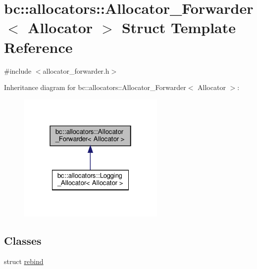 \hypertarget{structbc_1_1allocators_1_1Allocator__Forwarder}{}\section{bc\+:\+:allocators\+:\+:Allocator\+\_\+\+Forwarder$<$ Allocator $>$ Struct Template Reference}
\label{structbc_1_1allocators_1_1Allocator__Forwarder}


{\ttfamily \#include $<$allocator\+\_\+forwarder.\+h$>$}



Inheritance diagram for bc\+:\+:allocators\+:\+:Allocator\+\_\+\+Forwarder$<$ Allocator $>$\+:\nopagebreak
\begin{figure}[H]
\begin{center}
\leavevmode
\includegraphics[width=202pt]{structbc_1_1allocators_1_1Allocator__Forwarder__inherit__graph}
\end{center}
\end{figure}
\subsection*{Classes}
\begin{DoxyCompactItemize}
\item 
struct \hyperlink{structbc_1_1allocators_1_1Allocator__Forwarder_1_1rebind}{rebind}
\end{DoxyCompactItemize}
